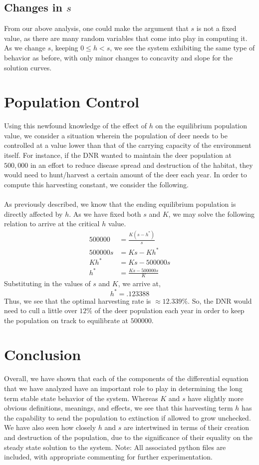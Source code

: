 \documentclass[letterpaper,12pt]{article}
\begin{document}
\subsection{Changes in $s$}
From our above analysis, one could make the argument that $s$ is not a fixed value, as there are many random variables that come into play in computing it. As we change $s$, keeping $0\leq h<s$, we see the system exhibiting the same type of behavior as before, with only minor changes to concavity and slope for the solution curves.
\section{Population Control}
Using this newfound knowledge of the effect of $h$ on the equilibrium population value, we consider a situation wherein the population of deer needs to be controlled at a value lower than that of the carrying capacity of the environment itself. For instance, if the DNR wanted to maintain the deer population at $500,000$ in an effort to reduce disease spread and destruction of the habitat, they would need to hunt/harvest a certain amount of the deer each year. In order to compute this harvesting constant, we consider the following.\\\\
As previously described, we know that the ending equilibrium population is directly affected by $h$. As we have fixed both $s$ and $K$, we may solve the following relation to arrive at the critical $h$ value.
\begin{align*}
500000 &= \frac{K(s-h^*)}{s}\\
500000s &= Ks-Kh^*\\
Kh^* &= Ks-500000s\\
h^* &= \frac{Ks-500000s}{K}
\end{align*}
Substituting in the values of $s$ and $K$, we arrive at,
\[h^*=.123388\]
Thus, we see that the optimal harvesting rate is $\approx12.339\%$. So, the DNR would need to cull a little over $12\%$ of the deer population each year in order to keep the population on track to equilibrate at $500000$.
\section{Conclusion}
Overall, we have shown that each of the components of the differential equation that we have analyzed have an important role to play in determining the long term stable state behavior of the system. Whereas $K$ and $s$ have slightly more obvious definitions, meanings, and effects, we see that this harvesting term $h$ has the capability to send the population to extinction if allowed to grow unchecked. We have also seen how closely $h$ and $s$ are intertwined in terms of their creation and destruction of the population, due to the significance of their equality on the steady state solution to the system.
\newpage
Note: All associated python files are included, with appropriate commenting for further experimentation.
\end{document}
